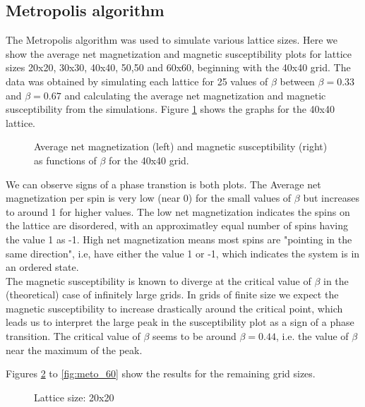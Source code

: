 \documentclass[11pt,a4paper]{article}
\begin{document}
 

\subsection{Metropolis algorithm}

The Metropolis algorithm was used to simulate various lattice sizes. Here we show the average net magnetization and magnetic 
 susceptibility plots for lattice sizes 20x20, 30x30, 40x40, 50,50 and 60x60, beginning with the 40x40 grid. The data was 
 obtained by simulating each lattice for 25 values of $\beta$ between $\beta = 0.33$ and $\beta = 0.67$ and calculating the 
 average net magnetization and magnetic susceptibility from the simulations. Figure \ref{fig:meto_40} shows the graphs for the
 40x40 lattice. 


\begin{figure}[h!]

  \caption{Average net magnetization (left) and magnetic susceptibility (right) as functions of $\beta$ for the 40x40 grid.}

\label{fig:meto_40}
\end{figure}

We can observe signs of a phase transtion is both plots. The Average net magnetization per spin is very low (near 0) for the 
 small values of $\beta$ but increases to around 1 for higher values. The low net magnetization indicates the spins on the lattice
 are disordered, with an approximatley equal number of spins having the value 1 as -1. High net magnetization means most spins are
 "pointing in the same direction", i.e, have either the value 1 or -1, which indicates the system is in an ordered state. \\

The magnetic susceptibility is known to diverge at the critical value of $\beta$ in the (theoretical) case of infinitely large grids.
 In grids of finite size we expect the magnetic susceptibility to increase drastically around the critical point, which leads us 
 to interpret the large peak in the susceptibility plot as a sign of a phase transition. The critical value of $\beta$ seems to 
 be around $\beta = 0.44$, i.e. the value of $\beta$ near the maximum of the peak. 

Figures \ref{fig:meto_20} to \ref{fig:meto_60} show the results for the remaining grid sizes. 

\begin{figure}[h!]

  \caption{Lattice size: 20x20}

\label{fig:meto_20}
\end{figure}
\end{document}
